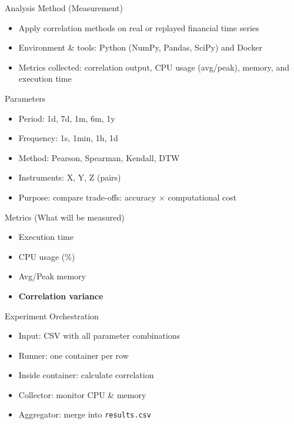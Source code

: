 \documentclass[10pt]{beamer}
\begin{document}
\begin{frame}{Analysis Method (Measurement)}
\begin{itemize}
  \item Apply correlation methods on real or replayed financial time series
  \item Environment \& tools: Python (NumPy, Pandas, SciPy) and Docker
  \item Metrics collected: correlation output, CPU usage (avg/peak), memory, and execution time
\end{itemize}
\end{frame}


\begin{frame}{Parameters }
\begin{itemize}
  \item Period: 1d, 7d, 1m, 6m, 1y
  \item Frequency: 1s, 1min, 1h, 1d
  \item Method: Pearson, Spearman, Kendall, DTW
  \item Instruments: X, Y, Z (pairs)
  \item Purpose: compare trade-offs: accuracy × computational cost
\end{itemize}
\end{frame}

\begin{frame}{Metrics (What will be measured)}
\begin{itemize}
      \item Execution time
      \item CPU usage (\%)
      \item Avg/Peak memory 
      \item \textbf{Correlation variance}
    \end{itemize}
\end{frame}

\begin{frame}{Experiment Orchestration}
\begin{itemize}
  \item Input: CSV with all parameter combinations
  \item Runner: one container per row
  \item Inside container: calculate correlation
  \item Collector: monitor CPU \& memory
  \item Aggregator: merge into \texttt{results.csv}
\end{itemize}
\end{frame}
\end{document}
